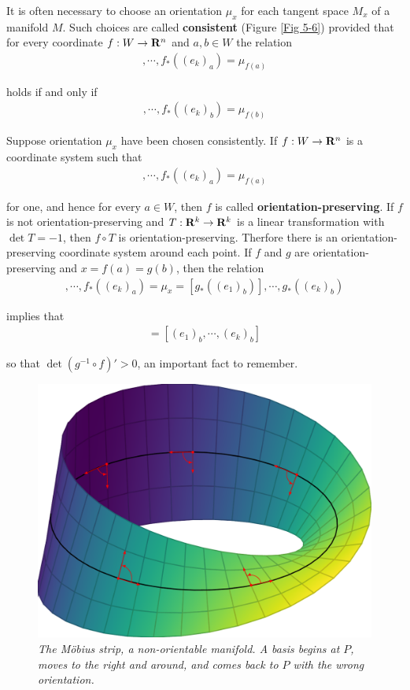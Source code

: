 It is often necessary to choose an orientation $\mu_x$ for each
tangent space $M_x$ of a manifold $M$. Such choices are called
\textbf{consistent} (Figure \ref{Fig 5-6}) provided that for every coordinate
$f:W\to\mathbf{R}^n$ and $a,b\in W$ the relation 
\begin{align*}
    [f_*((e_1)_a)], \cdots, f_*((e_k)_a) = \mu_{f(a)}
\end{align*}

holds if and only if 
\begin{align*}
    [f_*((e_1)_b)], \cdots, f_*((e_k)_b) = \mu_{f(b)}
\end{align*}

Suppose orientation $\mu_x$ have been chosen consistently. If 
$f:W\to\mathbf{R}^n$ is a coordinate system such that 
\begin{align*}
    [f_*((e_1)_a)], \cdots, f_*((e_k)_a) = \mu_{f(a)}
\end{align*}

for one, and hence for every $a\in W$, then $f$ is called \textbf{orientation-preserving}.
If $f$ is not orientation-preserving and $T:\mathbf{R}^k\to\mathbf{R}^k$ is a linear transformation with 
$\det T=-1$, then $f\circ T$ is orientation-preserving. Therfore there is an orientation-preserving
coordinate system around each point. If $f$ and $g$ are orientation-preserving and $x=f(a)=g(b)$, then 
the relation 
\begin{align*}
    [f_*((e_1)_a)], \cdots, f_*((e_k)_a) 
    = \mu_x
    = [g_*( (e_1)_b)], \cdots, g_*((e_k)_b)
\end{align*}

implies that 
\begin{align*}
    [(g^{-1}\circ f)_*((e_1)_a), \cdots, (g^{-1}\circ f)_*((e_k)_a)] 
    = [(e_1)_b, \cdots, (e_k)_b]
\end{align*}

so that $\det (g^{-1}\circ f)'>0$, an important fact to remember.

\begin{figure}[!htb]
    \centering
    \includegraphics[width=.75\linewidth]{./pics/Fig5-7.pdf}
    \caption{\textit{The M\"obius strip, a non-orientable manifold. A
    basis begins at $P$, moves to the right and around, and comes back to $P$ with
    the wrong orientation.}}
    \label{Fig 5-7}
\end{figure}

